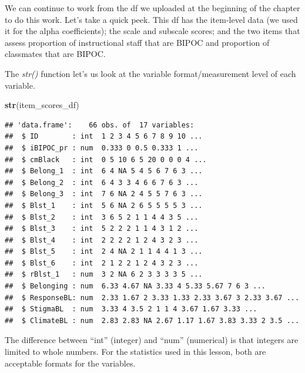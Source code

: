 \documentclass[
  11pt,
]{book}
\newenvironment{Shaded}{\begin{snugshade}}{\end{snugshade}}
\newcommand{\FunctionTok}[1]{\textcolor[rgb]{0.27,0.27,0.27}{\textbf{#1}}}
\newcommand{\NormalTok}[1]{#1}
\begin{document}
We can continue to work from the df we uploaded at the beginning of the chapter to do this work. Let's take a quick peek. This df has the item-level data (we used it for the alpha coefficients); the scale and subscale scores; and the two items that assess proportion of instructional staff that are BIPOC and proportion of classmates that are BIPOC.

The \emph{str()} function let's us look at the variable format/measurement level of each variable.

\begin{Shaded}
\begin{Highlighting}[]
\FunctionTok{str}\NormalTok{(item\_scores\_df)}
\end{Highlighting}
\end{Shaded}

\begin{verbatim}
## 'data.frame':    66 obs. of  17 variables:
##  $ ID        : int  1 2 3 4 5 6 7 8 9 10 ...
##  $ iBIPOC_pr : num  0.333 0 0.5 0.333 1 ...
##  $ cmBlack   : int  0 5 10 6 5 20 0 0 0 4 ...
##  $ Belong_1  : int  6 4 NA 5 4 5 6 7 6 3 ...
##  $ Belong_2  : int  6 4 3 3 4 6 6 7 6 3 ...
##  $ Belong_3  : int  7 6 NA 2 4 5 5 7 6 3 ...
##  $ Blst_1    : int  5 6 NA 2 6 5 5 5 5 3 ...
##  $ Blst_2    : int  3 6 5 2 1 1 4 4 3 5 ...
##  $ Blst_3    : int  5 2 2 2 1 1 4 3 1 2 ...
##  $ Blst_4    : int  2 2 2 2 1 2 4 3 2 3 ...
##  $ Blst_5    : int  2 4 NA 2 1 1 4 4 1 3 ...
##  $ Blst_6    : int  2 1 2 2 1 2 4 3 2 3 ...
##  $ rBlst_1   : num  3 2 NA 6 2 3 3 3 3 5 ...
##  $ Belonging : num  6.33 4.67 NA 3.33 4 5.33 5.67 7 6 3 ...
##  $ ResponseBL: num  2.33 1.67 2 3.33 1.33 2.33 3.67 3 2.33 3.67 ...
##  $ StigmaBL  : num  3.33 4 3.5 2 1 1 4 3.67 1.67 3.33 ...
##  $ ClimateBL : num  2.83 2.83 NA 2.67 1.17 1.67 3.83 3.33 2 3.5 ...
\end{verbatim}

The difference between ``int'' (integer) and ``num'' (numerical) is that integers are limited to whole numbers. For the statistics used in this lesson, both are acceptable formats for the variables.
\end{document}
